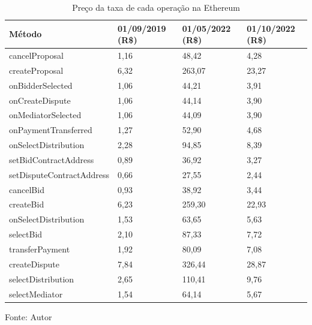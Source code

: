 \begin{table}[!h]
\centering
\caption{Preço da taxa de cada operação na Ethereum}
\label{tab:report_prices_per_method_ethereum}
\begin{tabular}{@{}llll@{}}
\toprule
Método & 01/09/2019 (R\$) & 01/05/2022 (R\$) & 01/10/2022 (R\$) \\ \midrule
cancelProposal & 1,16 & 48,42 & 4,28 \\
createProposal & 6,32 & 263,07 & 23,27 \\
onBidderSelected & 1,06 & 44,21 & 3,91 \\
onCreateDispute & 1,06 & 44,14 & 3,90 \\
onMediatorSelected & 1,06 & 44,09 & 3,90 \\
onPaymentTransferred & 1,27 & 52,90 & 4,68 \\
onSelectDistribution & 2,28 & 94,85 & 8,39 \\
setBidContractAddress & 0,89 & 36,92 & 3,27 \\
setDisputeContractAddress & 0,66 & 27,55 & 2,44 \\
cancelBid & 0,93 & 38,92 & 3,44 \\
createBid & 6,23 & 259,30 & 22,93 \\
onSelectDistribution & 1,53 & 63,65 & 5,63 \\
selectBid & 2,10 & 87,33 & 7,72 \\
transferPayment & 1,92 & 80,09 & 7,08 \\
createDispute & 7,84 & 326,44 & 28,87 \\
selectDistribution & 2,65 & 110,41 & 9,76 \\
selectMediator & 1,54 & 64,14 & 5,67 \\ \bottomrule
\end{tabular}
\begin{tablenotes}
  \small
  \item Fonte: Autor
\end{tablenotes}
\end{table}


